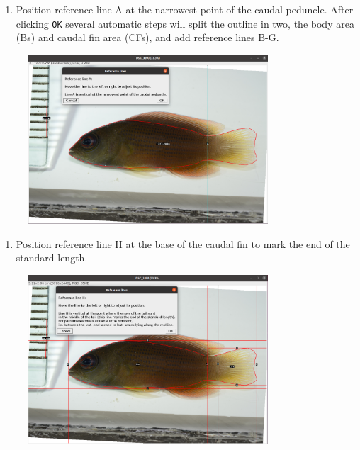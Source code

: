 \documentclass[
  letterpaper,
  DIV=11,
  numbers=noendperiod,
  oneside]{scrreprt}
\providecommand{\tightlist}{%
  \setlength{\itemsep}{0pt}\setlength{\parskip}{0pt}}\usepackage{longtable,booktabs,array}
\begin{document}
\begin{enumerate}
\def\labelenumi{\arabic{enumi}.}
\setcounter{enumi}{4}
\tightlist
\item
  Position reference line A at the narrowest point of the caudal
  peduncle. After clicking \texttt{OK} several automatic steps will
  split the outline in two, the body area (Bs) and caudal fin area
  (CFs), and add reference lines B-G.
\end{enumerate}

\begin{figure}

{\centering \includegraphics[width=0.8\textwidth,height=\textheight]{./images/screenshots/ref_lineA.png}

}

\end{figure}

\begin{enumerate}
\def\labelenumi{\arabic{enumi}.}
\setcounter{enumi}{5}
\tightlist
\item
  Position reference line H at the base of the caudal fin to mark the
  end of the standard length.
\end{enumerate}

\begin{figure}

{\centering \includegraphics[width=0.8\textwidth,height=\textheight]{./images/screenshots/ref_lineH.png}

}

\end{figure}
\end{document}
